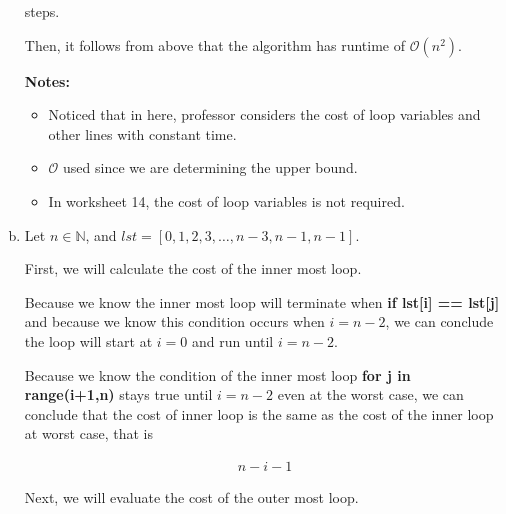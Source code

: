\documentclass[12pt]{article}
\begin{document}
\begin{enumerate}[a.]
\begin{mdframed}
        steps.

        \bigskip

        Then, it follows from above that the algorithm has runtime of \color{red}$\mathcal{O}(n^2)$\color{black}.

    \end{mdframed}

    \bigskip

    \textbf{Notes:}

    \begin{itemize}
        \item Noticed that in here, professor considers the cost of loop variables and
        other lines with constant time.

        \item $\mathcal{O}$ used since we are determining the upper bound.

        \item In worksheet 14, the cost of loop variables is not required.

    \end{itemize}

    \item

    Let $n \in \mathbb{N}$, and $lst = [0,1,2,3,\dots,n-3,n-1,n-1]$.

    \bigskip

    First, we will calculate the cost of the inner most loop.

    \bigskip

    Because we know the inner most loop will terminate when \textbf{if lst[i] == lst[j]} and because we know
    this condition occurs when $i = n-2$, we can conclude the loop will start
    at $i = 0$ and run until $i = n - 2$.

    \bigskip

    Because we know the condition of the inner most loop \textbf{for j in range(i+1,n)}
    stays true until $i = n - 2$ even at the worst case, we can conclude that the cost of
    inner loop is the same as the cost of the inner loop at worst case, that is

    \setcounter{equation}{0}
    \begin{align}
        n - i - 1
    \end{align}

    \bigskip

    Next, we will evaluate the cost of the outer most loop.

    \bigskip


\end{enumerate}
\end{document}
